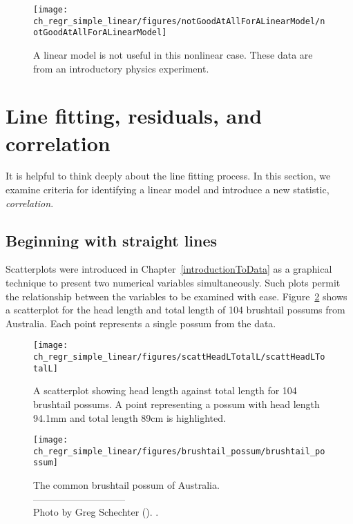 \begin{figure}
   \centering
   \texttt{[image: ch\_regr\_simple\_linear/figures/notGoodAtAllForALinearModel/notGoodAtAllForALinearModel]}
   \caption{A linear model is not useful in this nonlinear case. These data are from an introductory physics experiment.}
   \label{notGoodAtAllForALinearModel}
\end{figure}



\textC{\newpage}



\section[Line fitting, residuals, and correlation]{Line fitting, residuals, and correlation }
\label{lineFittingResidualsCorrelation}

It is helpful to think deeply about the line fitting process. In this section, we examine criteria for identifying a linear model and introduce a new statistic, \emph{correlation}.

\subsection{Beginning with straight lines}


Scatterplots were introduced in Chapter~\ref{introductionToData} as a graphical technique to present two numerical variables simultaneously. Such plots permit the relationship between the variables to be examined with ease. Figure~\ref{scattHeadLTotalL} shows a scatterplot for the head length and total length of 104 brushtail possums from Australia. Each point represents a single possum from the data.

\begin{figure}
   \centering
   \texttt{[image: ch\_regr\_simple\_linear/figures/scattHeadLTotalL/scattHeadLTotalL]}
   \caption{A scatterplot showing head length against total length for 104 brushtail possums. A point representing a possum with head length 94.1mm and total length 89cm is highlighted.}
   \label{scattHeadLTotalL}
\end{figure}

\setlength{\captionwidth}{0.83\mycaptionwidth}
\begin{figure}
   \centering
   \texttt{[image: ch\_regr\_simple\_linear/figures/brushtail\_possum/brushtail\_possum]}
   \caption{The common brushtail possum of Australia.\vspace{-1mm} \\
   -----------------------------\vspace{-2mm}\\
   {\footnotesize Photo by Greg Schechter (). .}\vspace{-8mm}}
   \label{brushtail_possum}
\end{figure}
\setlength{\captionwidth}{\mycaptionwidth}

